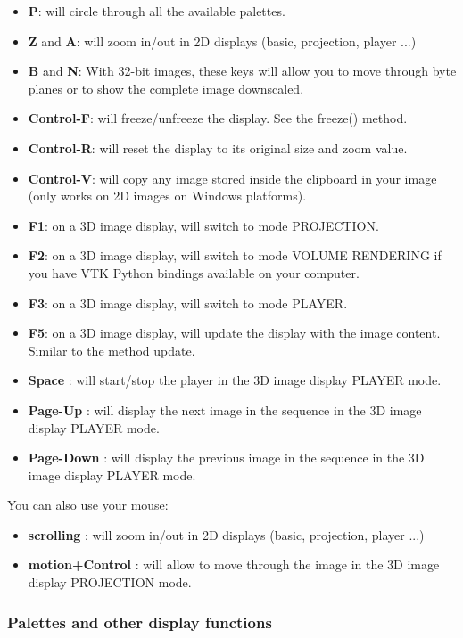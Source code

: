 \documentclass[a4paper,10pt,oneside]{article}
\begin{document}
\begin{itemize}
\item \textbf{P}: will circle through all the available palettes.
\item \textbf{Z} and \textbf{A}: will zoom in/out in 2D displays (basic, 
projection, player ...)
\item \textbf{B} and \textbf{N}: With 32-bit images, these keys will allow you
to move through byte planes or to show the complete image downscaled.
\item \textbf{Control-F}: will freeze/unfreeze the display. See the freeze() 
method.
\item \textbf{Control-R}: will reset the display to its original size and
zoom value.
\item \textbf{Control-V}: will copy any image stored inside the clipboard 
in your image (only works on 2D images on Windows platforms).
\item \textbf{F1}: on a 3D image display, will switch to mode PROJECTION.
\item \textbf{F2}: on a 3D image display, will switch to mode VOLUME
RENDERING if you have VTK Python bindings available on your computer.
\item \textbf{F3}: on a 3D image display, will switch to mode PLAYER.
\item \textbf{F5}: on a 3D image display, will update the display with
the image content. Similar to the method update.
\item \textbf{Space} : will start/stop the player in the 3D image display
PLAYER mode.
\item \textbf{Page-Up} : will display the next image in the sequence in the
3D image display PLAYER mode.
\item \textbf{Page-Down} : will display the previous image in the sequence
in the 3D image display PLAYER mode.
\end{itemize}

You can also use your mouse:

\begin{itemize}
\item \textbf{scrolling} : will zoom in/out in 2D displays (basic, 
projection, player ...)
\item \textbf{motion+Control} : will allow to move through the image
in the 3D image display PROJECTION mode.
\end{itemize}

\subsubsection{Palettes and other display functions}
\end{document}

